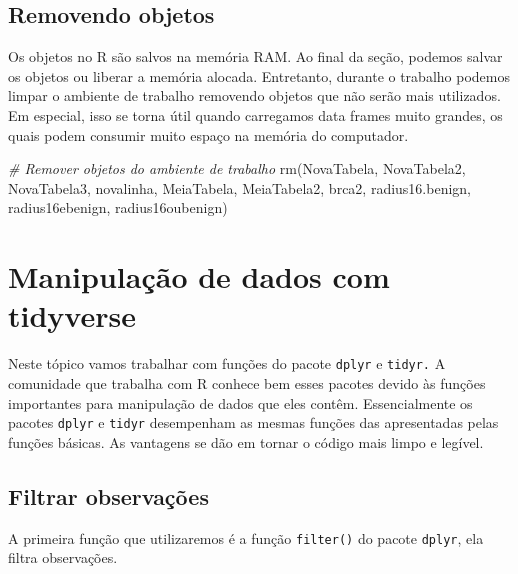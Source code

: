 \documentclass[
]{book}
\newenvironment{Shaded}{\begin{snugshade}}{\end{snugshade}}
\newcommand{\CommentTok}[1]{\textcolor[rgb]{0.56,0.35,0.01}{\textit{#1}}}
\newcommand{\FunctionTok}[1]{\textcolor[rgb]{0.00,0.00,0.00}{#1}}
\newcommand{\NormalTok}[1]{#1}
\begin{document}
\hypertarget{removendo-objetos}{%
\subsection{Removendo objetos}\label{removendo-objetos}}

Os objetos no R são salvos na memória RAM. Ao final da seção, podemos salvar os objetos ou liberar a memória alocada. Entretanto, durante o trabalho podemos limpar o ambiente de trabalho removendo objetos que não serão mais utilizados. Em especial, isso se torna útil quando carregamos data frames muito grandes, os quais podem consumir muito espaço na memória do computador.

\begin{Shaded}
\begin{Highlighting}[]
\CommentTok{\# Remover objetos do ambiente de trabalho}
\FunctionTok{rm}\NormalTok{(NovaTabela, NovaTabela2, NovaTabela3, novalinha,}
\NormalTok{MeiaTabela, MeiaTabela2, brca2, radius16.benign,}
\NormalTok{radius16ebenign, radius16oubenign)}
\end{Highlighting}
\end{Shaded}

\hypertarget{manipulauxe7uxe3o-de-dados-com-tidyverse}{%
\section{Manipulação de dados com tidyverse}\label{manipulauxe7uxe3o-de-dados-com-tidyverse}}

Neste tópico vamos trabalhar com funções do pacote \texttt{dplyr} e \texttt{tidyr.} A comunidade que trabalha com R conhece bem esses pacotes devido às funções importantes para manipulação de dados que eles contêm. Essencialmente os pacotes \texttt{dplyr} e \texttt{tidyr} desempenham as mesmas funções das apresentadas pelas funções básicas. As vantagens se dão em tornar o código mais limpo e legível.

\hypertarget{filtrar-observauxe7uxf5es-1}{%
\subsection{Filtrar observações}\label{filtrar-observauxe7uxf5es-1}}

A primeira função que utilizaremos é a função \texttt{filter()} do pacote \texttt{dplyr}, ela filtra observações.
\end{document}
